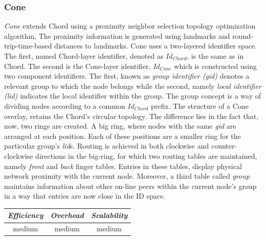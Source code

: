 \subsubsection{Cone}
\emph{Cone} \cite{HY2007} extends Chord using a proximity neighbor
selection topology optimization algorithm. The proximity information is
generated using landmarks and round-trip-time-based distances to landmarks.
Cone uses a two-layered identifier space. The first, named Chord-layer
identifier, denoted as $Id_{Chord}$, is the same as in Chord. The second is the
Cone-layer identifier, $Id_{Cone}$ which is constructed using two component
identifiers. The first, known as \emph{group identifier (gid)} denotes a
relevant group to which the node belongs while the second, namely \emph{local
identifier (lid)} indicates the local identifier within the group. The group
concept is a way of dividing nodes according to a
common $Id_{Chord}$ prefix.  The structure of a Cone overlay, retains the
Chord's circular topology. The difference lies in the fact that, now, two rings
are created. A big ring, where nodes with the same \emph{gid} are arranged at
each position. Each of these positions are a smaller ring for the particular
group's \emph{lid}s. Routing is achieved in both clockwise and
counter-clockwise directions in the big-ring, for which two routing tables are
maintained, namely \emph{front} and \emph{back} finger tables. Entries in these
tables, display physical network proximity with the current node. Moreover, a
third table called \emph{group} maintains information about other on-line peers
within the current node's group in a way that entries are now close in the ID
space.

%
%

\begin{center}
\begin{tabular}{ccc}
\emph{Efficiency} & \emph{Overhead} & \emph{Scalability} \\
\hline
medium &
medium &
medium
\end{tabular}
\end{center}


